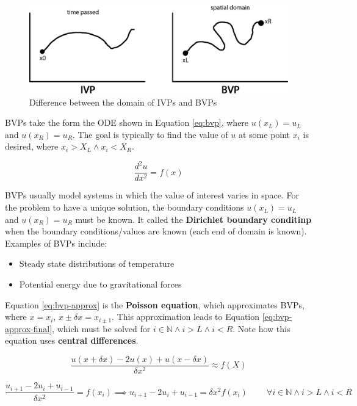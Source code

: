 \documentclass{article}
\begin{document}
\begin{figure}
	\centering
	\includegraphics[scale=0.3]{figures/ivp-bvp-comparison.png}
	\caption{Difference between the domain of IVPs and BVPs}
	\label{fig:ivp-bvp-comparison}
\end{figure}

BVPs take the form the ODE shown in Equation \ref{eq:bvp}, where $u(x_L) = u_L$ and $u(x_R) = u_R$. The goal is typically to find the value of $u$ at some point $x_i$ is desired, where $x_i > X_L \land x_i < X_R$.

\begin{equation}
	\frac{d^2 u}{dx^2} = f(x)
	\label{eq:bvp}
\end{equation}

BVPs usually model systems in which the value of interest varies in space. For the problem to have a unique solution, the boundary conditions $u(x_L) = u_L$ and $u(x_R) = u_R$ must be known. It called the \textbf{Dirichlet boundary conditinp} when the boundary conditions/values are known (each end of domain is known). Examples of BVPs include:
\begin{itemize}
	\item Steady state distributions of temperature
	\item Potential energy due to gravitational forces
\end{itemize}

Equation \ref{eq:bvp-approx} is the \textbf{Poisson equation}, which approximates BVPs, where $x = x_i$, $x \pm \delta x = x_{i \pm 1}$. This approximation leads to Equation \ref{eq:bvp-approx-final}, which must be solved for $i \in \mathbb{N} \land i > L \land i < R$. Note how this equation uses \textbf{central differences}.

\begin{equation}
	\frac{u(x + \delta x) - 2u(x) + u(x - \delta x)}{\delta x^2} \approx f(X)
	\label{eq:bvp-approx}
\end{equation}

\begin{equation}
	\frac{u_{i+1} - 2u_i + u_{i - 1}}{\delta x^2} = f(x_i)
	\implies
	u_{i+1} - 2u_i + u_{i - 1} = \delta x^2 f(x_i)
	\;\;\;\;\;\;\;\; \forall
	i \in \mathbb{N} \land i > L \land i < R
	\label{eq:bvp-approx-final}
\end{equation}
\end{document}
